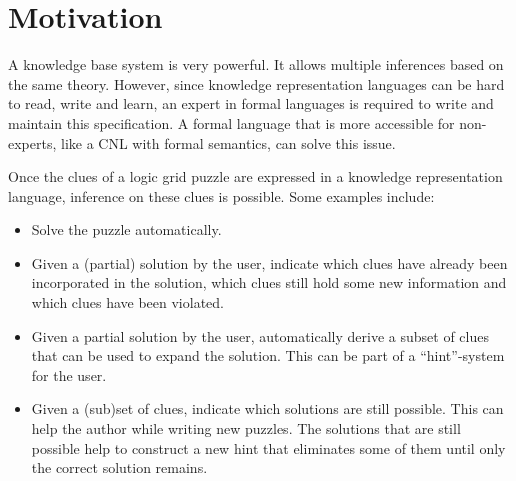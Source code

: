 \section{Motivation}
A knowledge base system is very powerful. It allows multiple inferences based on the same theory. However, since knowledge representation languages can be hard to read, write and learn, an expert in formal languages is required to write and maintain this specification. A formal language that is more accessible for non-experts, like a CNL with formal semantics, can solve this issue.

Once the clues of a logic grid puzzle are expressed in a knowledge representation language, inference on these clues is possible. Some examples include:
\begin{itemize}
  \item Solve the puzzle automatically.
  \item Given a (partial) solution by the user, indicate which clues have already been incorporated in the solution, which clues still hold some new information and which clues have been violated.
  \item Given a partial solution by the user, automatically derive a subset of clues that can be used to expand the solution. This can be part of a ``hint''-system for the user.
  \item Given a (sub)set of clues, indicate which solutions are still possible. This can help the author while writing new puzzles. The solutions that are still possible help to construct a new hint that eliminates some of them until only the correct solution remains.
\end{itemize}

